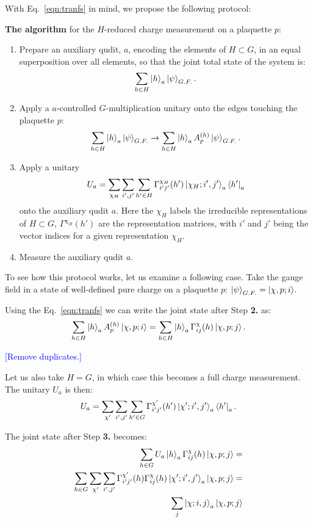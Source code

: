 \documentclass[two column]{article}
\newcommand{\jovan}[1]{\textcolor{blue}{[#1]}}
\begin{document}
With Eq.~\eqref{eqn:tranfs} in mind, we propose the following protocol:

\textbf{The algorithm} for the $H$-reduced charge measurement on a plaquette $p$:\begin{enumerate}
    \item Prepare an auxiliary qudit, $a$, encoding the elements of $H\subset G$, in an equal superposition over all elements, so that the joint total state of the system is: $$ \sum_{h \in H} \ket{h}_a\ket{\psi}_{G.F.}. $$
    \item Apply a $a$-controlled $G$-multiplication unitary onto the edges touching the plaquette $p$:$$ \sum_{h \in H} \ket{h}_a\ket{\psi}_{G.F.} \rightarrow \sum_{h \in H} \ket{h}_a A^{(h)}_p \ket{\psi}_{G.F.}. $$
    \item Apply a unitary $$ U_a = \sum_{\chi_H}\sum_{i', j'}\sum_{h'\in H}  \Gamma^{\chi_H}_{i'j'}(h')  \ket{\chi_H; i', j'}_a\bra{h'}_a $$ onto the auxiliary qudit $a$. Here the $\chi_H$ labels the irreducible representations of $H \subset G$, $\Gamma^{\chi_H}(h')$ are the representation matrices, with $i'$ and $j'$ being the vector indices for a given representation $\chi_H$.
    \item Measure the auxiliary qudit $a$.
\end{enumerate}

To see how this protocol works, let us examine a following case.
Take the gauge field in a state of well-defined pure charge on a plaquette $p$: $\ket{\psi}_{G.F.} = \ket{\chi, p; i}$.

Using the Eq.~\eqref{eqn:tranfs} we can write the joint state after Step \textbf{2.} as:
\begin{equation}
    \sum_{h \in H} \ket{h}_a A^{(h)}_p \ket{\chi, p; i} = \sum_{h \in H} \ket{h}_a \Gamma^{\chi}_{ij}(h) \ket{\chi, p; j}.
\end{equation}


\jovan{Remove duplicates.}

Let us also take $H = G$, in which case this becomes a full charge measurement. The unitary $U_a$ is then: \begin{equation}
    U_a = \sum_{\chi'}\sum_{i', j'}\sum_{h'\in G}  \Gamma^{\chi'}_{i'j'}(h') \ket{\chi'; i', j'}_a\bra{h'}_a.
\end{equation}

The joint state after Step \textbf{3.} becomes:\begin{equation}
    \begin{split}
        \sum_{h \in G} U_a\ket{h}_a \Gamma^{\chi}_{ij}(h) \ket{\chi, p; j} = \\
        \sum_{h \in G} \sum_{\chi'}\sum_{i', j'}  \Gamma^{\chi'}_{i'j'}(h)\Gamma^{\chi}_{ij}(h) \ket{\chi'; i', j'}_a \ket{\chi, p; j} =\\
        \sum_j\ket{\chi; i, j}_a \ket{\chi, p; j}
    \end{split}
\end{equation}
\end{document}
